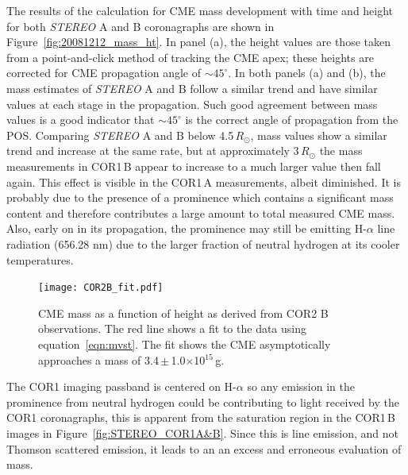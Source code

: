 The results of the calculation for CME mass development with time and height for both \emph{STEREO} A and B coronagraphs are shown in Figure~\ref{fig:20081212_mass_ht}. In panel (a), the height values are those taken from a point-and-click method of tracking the CME apex; these heights are corrected for CME propagation angle of $\sim$$45^{\circ}$.  In both panels (a) and (b), the mass estimates of \emph{STEREO} A and B follow a similar trend and have similar values at each stage in the propagation. Such good agreement between mass values is a good indicator that $\sim$$45^{\circ}$ is the correct angle of propagation from the POS. 
Comparing \emph{STEREO} A and B below 4.5\,$R_{\odot}$, mass values show a similar trend and increase at the same rate, but at approximately 3\,$R_{\odot}$ the mass measurements in COR1\,B appear to increase to a much larger value then fall again. This effect is visible in the COR1\,A measurements, albeit 
diminished. It is probably due to the presence of a prominence which contains a significant mass content and therefore contributes a large amount to total measured CME mass. Also, early on in its propagation, the prominence may still be emitting H-$\alpha$ line radiation (656.28 nm) due to the larger fraction of neutral hydrogen at its cooler temperatures.
\begin{figure}[!t]
\begin{center}
\texttt{[image: COR2B\_fit.pdf]}
\caption[CME mass as a function of height and time, COR2 B data only]{CME mass as a function of height as derived from COR2 B observations. The red line shows a fit to the data using equation~\ref{eqn:mvst}. The fit shows the CME asymptotically approaches a mass of 3.4\,$\pm$\,1.0$\times$10$^{15}$\,g.}
\label{fig:COR2B_fit}
\end{center}
\end{figure}
The COR1 imaging passband is centered on H-$\alpha$ so any emission in the prominence from neutral hydrogen could be contributing to light received by the COR1 coronagraphs, this is apparent from the saturation region in the COR1\,B images in Figure~\ref{fig:STEREO_COR1A&B}. Since this is line emission, and not Thomson scattered emission, it leads to an an excess and erroneous evaluation of mass.
